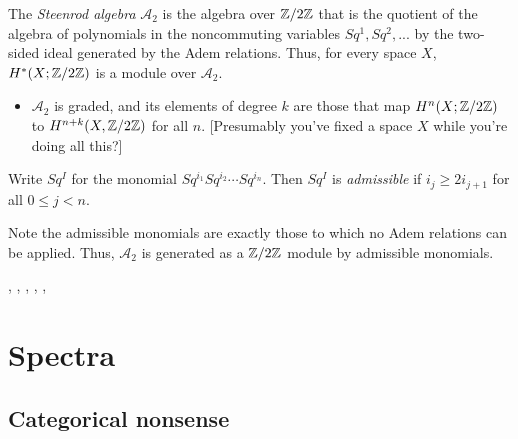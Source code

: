 \documentclass{MetricNotes2023}
\def\inte{\ensuremath\mathbb{Z}}
\def\A{\ensuremath{\mathscr{A}_2}}
\begin{document}
\begin{definition}
The \textit{Steenrod algebra} \(\mathscr{A}_2\) is the algebra over \(\inte/2\inte\) that is the quotient of the algebra of polynomials in the noncommuting variables \(Sq^1, Sq^2, ...\) by the two-sided ideal generated by the Adem relations. Thus, for every space \(X\), \(H^*(X; \inte/2\inte)\) is a module over \(\mathscr A_2\).
\end{definition}

\begin{itemize}
\item \(\mathscr A_2\) is graded, and its elements of degree \(k\) are those that map \(H^n(X; \inte/2\inte)\) to \(H^{n+k}(X, \inte/2\inte)\) for all \(n\). [Presumably you've fixed a space \(X\) while you're doing all this?]
\end{itemize}

\begin{definition}
Write \(Sq^I\) for the monomial \(Sq^{i_1}Sq^{i_2}\cdots Sq^{i_n}\). Then \(Sq^I\) is \textit{admissible} if \(i_j\geq 2i_{j+1}\) for all \(0\leq j < n\). 
\end{definition}

Note the admissible monomials are exactly those to which no Adem relations can be applied. Thus, \(\A\) is generated as a \(\inte/2\inte\) module by admissible monomials. 

\autocite{stable_homotopy}, \autocite{cobordism}, 
\autocite{ass}, \autocite{spectra}, \autocite{hatcher}, \autocite{foundations}

\section{Spectra}

\subsection{Categorical nonsense}
\end{document}
